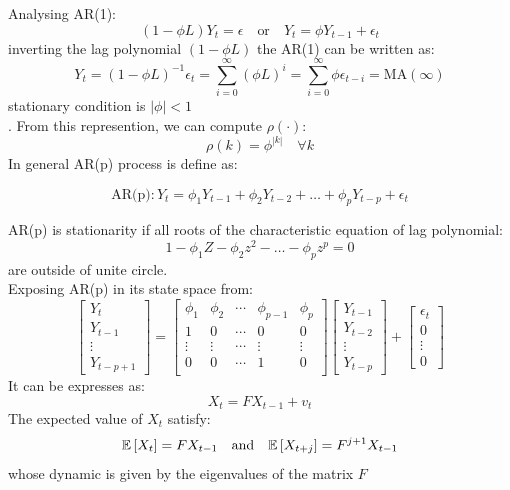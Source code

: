 Analysing AR(1):
\[
(1- \phi L)Y_t = \epsilon \quad \text{or} \quad Y_t = \phi Y_{t-1} + \epsilon_t
\] 
inverting the lag polynomial $(1- \phi L)$ the AR(1) can be written as:
\[
Y_t = (1- \phi L)^{-1}\epsilon_t = \sum_{i=0}^{\infty} (\phi L)^i = \sum_{i = 0}^\infty \phi\epsilon_{t-i} = \text{MA}(\infty)
\]
stationary condition is $|\phi| < 1$\\.
From this represention, we can compute $\rho(\cdot)$:
\[
\rho(k) = \phi^{|k|} \quad \forall k 
\]
\newpage
In general AR(p) process is define as:
\begin{mydefinition}[AR(p)]
	\begin{equation}
		\text{AR(p)}: Y_t = \phi_1Y_{t-1} + \phi_2Y_{t-2} + \ldots + \phi_p Y_{t-p} + \epsilon_t
	\end{equation}
\end{mydefinition}
AR(p) is stationarity if all roots of the characteristic equation of lag polynomial:
\[
1 - \phi_1Z - \phi_2z^2 - \ldots - \phi_pz^p=0
\]
are outside of unite circle.\\
Exposing AR(p) in its state space from:
\begin{equation*}
	\begin{bmatrix}
		Y_t \\
		Y_{t-1}\\
		\vdots\\
		Y_{t-p+1}
	\end{bmatrix} =
\begin{bmatrix}
	\phi_1 & \phi_2 & \cdots & \phi_{p-1} & \phi_p \\
	1 & 0 & \cdots & 0 & 0\\
	\vdots & \vdots & \cdots & \vdots & \vdots\\
	0 & 0 &\cdots &1 & 0\\
\end{bmatrix}
	\begin{bmatrix}
	Y_{t-1} \\
	Y_{t-2}\\
	\vdots\\
	Y_{t-p}
\end{bmatrix}
+
	\begin{bmatrix}
	\epsilon_t \\
	0\\
	\vdots\\
	0
\end{bmatrix}
\end{equation*}
It can be expresses as:
\[
X_t = F X_{t-1} + v_t
\]
The expected value of $X_t$ satisfy:
\[
\mathbb{E}\left[X_t\right] = F X_{t-1}\quad \text{and} \quad \mathbb{E}\left[X_{t+j}\right] = F^{j +1}X_{t-1}
\]
whose dynamic is given by the eigenvalues of the matrix $F$

